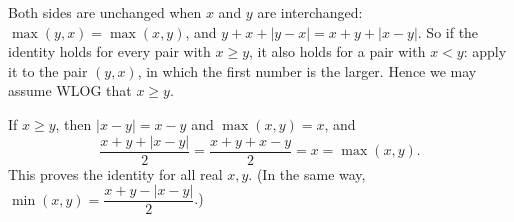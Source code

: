 Both sides are unchanged when $x$ and $y$ are interchanged: $\max(y,x)=\max(x,y)$, and $y+x+|y-x|=x+y+|x-y|$. So if the identity holds for every pair with $x\ge y$, it also holds for a pair with $x<y$: apply it to the pair $(y,x)$, in which the first number is the larger. Hence we may assume WLOG that $x\ge y$.

If $x\ge y$, then $|x-y|=x-y$ and $\max(x,y)=x$, and
\[
\dfrac{x+y+|x-y|}{2}=\dfrac{x+y+x-y}{2}=x=\max(x,y).
\]
This proves the identity for all real $x,y$. (In the same way, $\min(x,y)=\dfrac{x+y-|x-y|}{2}$.)
